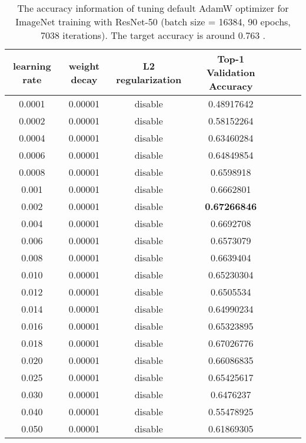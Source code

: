 \documentclass{article} \usepackage{iclr2020_conference,times}
\begin{document}
\begin{table}[ht]
\renewcommand{\arraystretch}{1.3}
\caption{The accuracy information of tuning default AdamW optimizer for ImageNet training with ResNet-50 (batch size = 16384, 90 epochs, 7038 iterations). The target accuracy is around 0.763 \citep{goyal2017accurate}.}
\centering
\begin{tabular}{|c|c|c|c|c|c|c|}
\hline
learning rate & weight decay & L2 regularization & Top-1 Validation Accuracy\\
\hline
\hline
0.0001 & 0.00001 & disable & 0.48917642 \\
\hline
0.0002 & 0.00001 & disable & 0.58152264 \\
\hline
0.0004 & 0.00001 & disable & 0.63460284 \\
\hline
0.0006 & 0.00001 & disable & 0.64849854 \\
\hline
0.0008 & 0.00001 & disable & 0.6598918 \\
\hline
0.001 & 0.00001 & disable & 0.6662801 \\
\hline
0.002 & 0.00001 & disable & {\bf 0.67266846} \\
\hline
0.004 & 0.00001 & disable & 0.6692708 \\
\hline
0.006 & 0.00001 & disable & 0.6573079 \\
\hline
0.008 & 0.00001 & disable & 0.6639404 \\
\hline
0.010 & 0.00001 & disable & 0.65230304 \\
\hline
0.012 & 0.00001 & disable & 0.6505534 \\
\hline
0.014 & 0.00001 & disable & 0.64990234 \\
\hline
0.016 & 0.00001 & disable & 0.65323895 \\
\hline
0.018 & 0.00001 & disable & 0.67026776 \\
\hline
0.020 & 0.00001 & disable & 0.66086835 \\
\hline
0.025 & 0.00001 & disable & 0.65425617 \\
\hline
0.030 & 0.00001 & disable & 0.6476237 \\
\hline
0.040 & 0.00001 & disable & 0.55478925 \\
\hline
0.050 & 0.00001 & disable & 0.61869305 \\
\hline
\end{tabular}
\label{table:imagenet_adamw_default_1}
\end{table}
\end{document}
